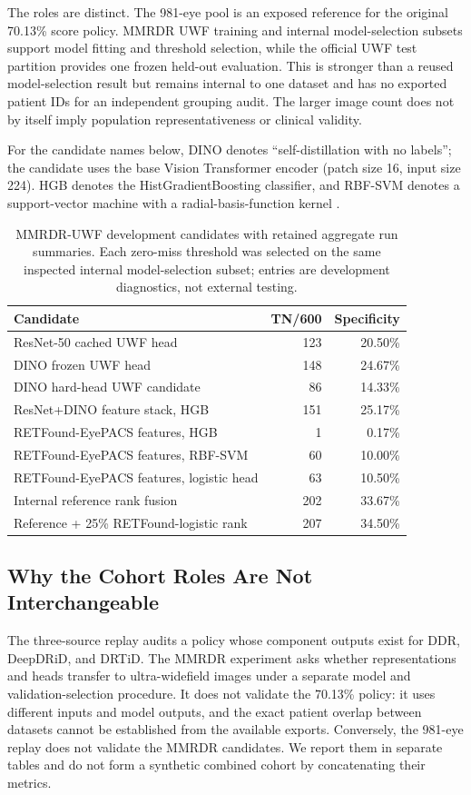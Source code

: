 \documentclass{ieeeaccess}
\begin{document}
The roles are distinct. The 981-eye pool is an exposed reference for the original 70.13\% score policy. MMRDR UWF training and internal model-selection subsets support model fitting and threshold selection, while the official UWF test partition provides one frozen held-out evaluation. This is stronger than a reused model-selection result but remains internal to one dataset and has no exported patient IDs for an independent grouping audit. The larger image count does not by itself imply population representativeness or clinical validity.

For the candidate names below, DINO denotes ``self-distillation with no labels''; the candidate uses the  base Vision Transformer encoder (patch size 16, input size 224). HGB denotes the HistGradientBoosting classifier, and RBF-SVM denotes a support-vector machine with a radial-basis-function kernel \cite{dino}.

\begin{table}[t]
\centering
\caption{MMRDR-UWF development candidates with retained aggregate run summaries. Each zero-miss threshold was selected on the same inspected internal model-selection subset; entries are development diagnostics, not external testing.}
\label{tab:mmrdr}
\begin{tabularx}{\columnwidth}{>{\raggedright\arraybackslash}Xrr}
\toprule
Candidate & TN/600 & Specificity \\
\midrule
ResNet-50 cached UWF head & 123 & 20.50\% \\
DINO frozen UWF head & 148 & 24.67\% \\
DINO hard-head UWF candidate & 86 & 14.33\% \\
ResNet+DINO feature stack, HGB & 151 & 25.17\% \\
RETFound-EyePACS features, HGB & 1 & 0.17\% \\
RETFound-EyePACS features, RBF-SVM & 60 & 10.00\% \\
RETFound-EyePACS features, logistic head & 63 & 10.50\% \\
Internal reference rank fusion & 202 & 33.67\% \\
Reference + 25\% RETFound-logistic rank & 207 & 34.50\% \\
\bottomrule
\end{tabularx}
\end{table}

\subsection{Why the Cohort Roles Are Not Interchangeable}
The three-source replay audits a policy whose component outputs exist for DDR, DeepDRiD, and DRTiD. The MMRDR experiment asks whether representations and heads transfer to ultra-widefield images under a separate model and validation-selection procedure. It does not validate the 70.13\% policy: it uses different inputs and model outputs, and the exact patient overlap between datasets cannot be established from the available exports. Conversely, the 981-eye replay does not validate the MMRDR candidates. We report them in separate tables and do not form a synthetic combined cohort by concatenating their metrics.
\end{document}
